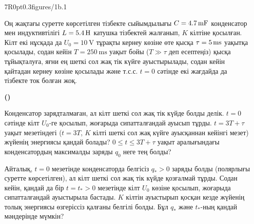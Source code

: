 
\pic7R{0pt}{0.3}{figures/1b.1}

Оң жақтағы суретте көрсетілген тізбекте сыйымдылығы $C=\qty{4.7}{\mF}$ конденсатор мен индуктивтілігі $L=\qty{5.4}{\H}$ катушка тізбектей жалғанып, $K$ кілтіне қосылған. Кілт екі нұсқада да $U_0=\qty{10}{\V}$ тұрақты кернеу көзіне өте қысқа $\tau=\qty5{\ms}$ уақытқа қосылады, содан кейін $T=\qty{250}{\ms}$ уақыт бойы ($T\gg\tau$ деп есептеңіз) қысқа тұйықталуға, яғни ең шеткі сол жақ тік күйге ауыстырылады, содан кейін қайтадан кернеу көзіне қосылады және т.с.с. $t=0$ сәтінде екі жағдайда да тізбекте ток болған жоқ.

\setcounter{taskstar}{0}
\begin{list}{\textbf{()}\ }{
\setlength{\leftmargin}{18pt}%
\setlength{\labelwidth}{0pt}%
\setlength{\labelsep}{0pt}%
\setlength{\itemsep}{6pt}%
\setlength{\topsep}{6pt}}
\item Конденсатор зарядталмаған, ал кілт шеткі сол жақ тік күйде болды делік. $t=0$ сәтінде кілт $U_0$-ге қосылып, жоғарыда сипатталғандай ауысып тұрды. $t=3T+\tau$ уақыт мезетіндегі ($t=3T$, $K$ кілті шеткі сол жақ күйге ауысқаннан кейінгі мезет) жүйенің энергиясы қандай болады? $0\leq t \leq 3T+\tau$ уақыт аралығындағы конденсатордың максималды заряды $q_0$ неге тең болды?
\item Айталық, $t=0$ мезетінде конденсаторда белгісіз $q_*>0$ заряды болды (полярлығы суретте көрсетілген), ал кілт шеткі сол жақ тік күйде қозғалмай тұрды. Содан кейін, қандай да бір $t=t_*>0$ мезетінде кілт $U_0$ көзіне қосылып, жоғарыда сипатталғандай ауыстырыла бастады. $K$ кілтін ауыстырып қосқан кезде жүйенің толық энергиясы өзгеріссіз қалғаны белгілі болды. Бұл $q_*$ және $t_*$-ның қандай мәндерінде мүмкін?
\end{list}
